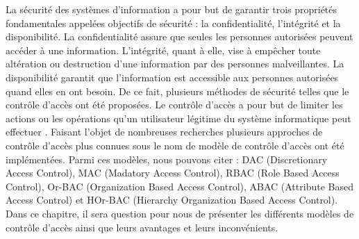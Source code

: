 \label{chapEtatDeLart}

\label{sectionIntroduction}

La sécurité des systèmes d'information a pour but de garantir trois propriétés fondamentales appelées objectifs de sécurité : la confidentialité, l'intégrité et la disponibilité. La confidentialité assure que seules les personnes autorisées peuvent accéder à une information. L'intégrité, quant à elle,  vise à empêcher toute altération ou destruction d'une information par des personnes malveillantes. La disponibilité garantit que l'information est accessible aux personnes autorisées quand elles en ont besoin. De ce fait, plusieurs méthodes de sécurité telles que le contrôle d'accès ont été proposées. Le contrôle d'accès a pour but de limiter les actions ou les opérations qu'un utilisateur légitime du système informatique peut effectuer \cite{sandhu94}. Faisant l'objet de nombreuses recherches plusieurs approches de contrôle d'accès plus connues sous le nom de modèle de contrôle d'accès ont été implémentées. Parmi ces modèles, nous pouvons citer : DAC (Discretionary Access Control), MAC (Madatory Access Control), RBAC (Role Based Access Control), Or-BAC (Organization Based Access Control), ABAC (Attribute Based Access Control) et HOr-BAC (Hierarchy Organization Based Access Control).\\
\hspace*{0.5cm} Dans ce chapitre, il sera question pour nous de présenter les différents modèles de contrôle d'accès ainsi que leurs avantages et leurs inconvénients.





\label{sectionDAC}

